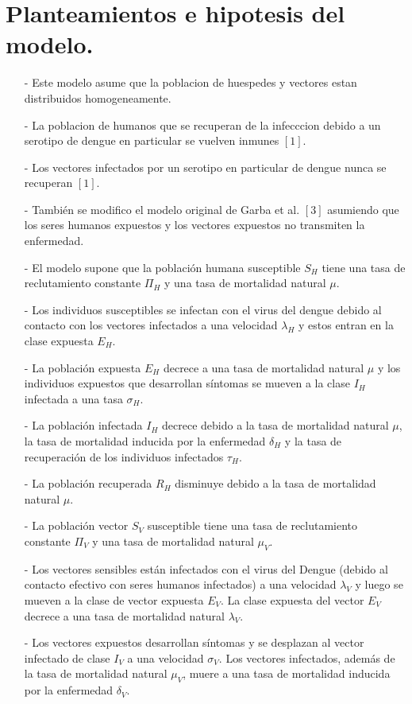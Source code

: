 	\section{Planteamientos e hipotesis del modelo.}
		\begin{enumerate}
			\item[-]
			Este modelo asume que la poblacion de huespedes y vectores estan distribuidos homogeneamente.
			\item[-]
			La poblacion de humanos que se recuperan de la infecccion debido a un serotipo de dengue en particular se vuelven inmunes $[1]$.
			\item[-]
			Los vectores infectados por un serotipo en particular de dengue nunca se recuperan $[1]$.
			\item[-]
			También se modifico el modelo original de Garba et al. $[3]$ asumiendo que los seres humanos expuestos y los vectores expuestos no transmiten la enfermedad.
			\item[-]
			El modelo supone que la población humana susceptible $S_H$ tiene una tasa de reclutamiento constante $\Pi_H$ y una tasa de mortalidad natural $\mu$.
			\item[-]
			Los individuos susceptibles se infectan con el virus del dengue debido al contacto con los vectores infectados a una velocidad $\lambda_H$ y estos entran en la clase expuesta $E_H$.
			\item[-]
			La población expuesta $E_H$ decrece a una tasa de mortalidad natural $\mu$ y los individuos expuestos que desarrollan síntomas se mueven a la clase $I_H$ infectada a una tasa $\sigma_H$.
			\item[-]
			La población infectada $I_H$ decrece debido a la tasa de mortalidad natural $\mu$, la tasa de mortalidad inducida por la enfermedad $\delta_H$ y la tasa de recuperación de los individuos infectados $\tau_H$.
			\item[-]
			La población recuperada $R_H$ disminuye debido a la tasa de mortalidad natural $\mu$.
			\item[-]
			La población vector $S_V$ susceptible tiene una tasa de reclutamiento constante $\Pi_V$ y una tasa de mortalidad natural $\mu_V$.
			\item[-]
			Los vectores sensibles están infectados con el virus del Dengue (debido al contacto efectivo con seres humanos infectados) a una velocidad $\lambda_V$ y luego se mueven a la clase de vector expuesta $E_V$.
			La clase expuesta del vector $E_V$ decrece a una tasa de mortalidad natural $\lambda_V$.
			\item[-]
			Los vectores expuestos desarrollan síntomas y se desplazan al vector infectado de clase $I_V$ a una velocidad $\sigma_V$.
			Los vectores infectados, además de la tasa de mortalidad natural $\mu_V$, muere a una tasa de mortalidad inducida por la enfermedad $\delta_V$.
		\end{enumerate}
	
